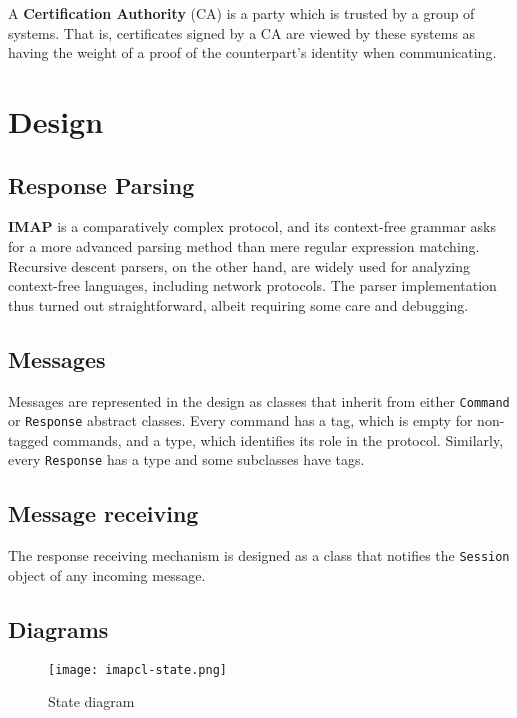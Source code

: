 \documentclass[a4]{report}
\begin{document}
A \textbf{Certification Authority} (CA) is a party which is trusted by a group of systems. That is, certificates signed by a CA are viewed by these systems as having the weight of a proof of the counterpart's identity when communicating.

\chapter{Design}


\section{Response Parsing}

\textbf{IMAP} is a comparatively complex protocol, and its context-free grammar asks for a more advanced parsing method than mere regular expression matching. Recursive descent parsers, on the other hand, are widely used for analyzing context-free languages, including network protocols. The parser implementation thus turned out straightforward, albeit requiring some care and debugging.

\section{Messages}

Messages are represented in the design as classes that inherit from either \texttt{Command} or \texttt{Response} abstract classes. Every command has a tag, which is empty for non-tagged commands, and a type, which identifies its role in the protocol. Similarly, every \texttt{Response} has a type and some subclasses have tags.

\section{Message receiving}

The response receiving mechanism is designed as a class that notifies the \texttt{Session} object of any incoming message.

\section{Diagrams}

\begin{figure}
  \centering
  \texttt{[image: imapcl-state.png]}
  \caption{State diagram}
  \label{state}
\end{figure}
\end{document}
